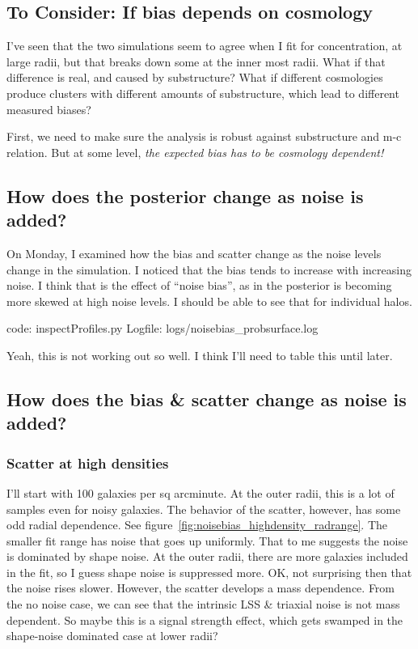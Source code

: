 \documentclass[11pt]{article}
\begin{document}

\subsection{To Consider: If bias depends on cosmology}

I've seen that the two simulations seem to agree when I fit for concentration, at large radii, but that breaks down some at the inner most radii. What if that difference is real, and caused by substructure? What if different cosmologies produce clusters with different amounts of substructure, which lead to different measured biases? 

First, we need to make sure the analysis is robust against substructure and m-c relation. But at some level, \emph{the expected bias has to be cosmology dependent!}


\subsection{How does the posterior change as noise is added?}
\label{sec:noisebias_posteriors}

On Monday, I examined how the bias and scatter change as the noise levels change in the simulation. I noticed that the bias tends to increase with increasing noise. I think that is the effect of ``noise bias'', as in the posterior is becoming more skewed at high noise levels. I should be able to see that for individual halos. 

code: inspectProfiles.py
Logfile: logs/noisebias\_probsurface.log

Yeah, this is not working out so well. I think I'll need to table this until later.


\subsection{How does the bias \& scatter change as noise is added?}
\label{sec:noisebias_bias}


\subsubsection{Scatter at high densities}

I'll start with 100 galaxies per sq arcminute. At the outer radii, this is a lot of samples even for noisy galaxies. The behavior of the scatter, however, has some odd radial dependence. See figure~\ref{fig:noisebias_highdensity_radrange}. The smaller fit range has noise that goes up uniformly. That to me suggests the noise is dominated by shape noise. At the outer radii, there are more galaxies included in the fit, so I guess shape noise is suppressed more. OK, not surprising then that the noise rises slower. However, the scatter develops a mass dependence. From the no noise case, we can see that the intrinsic LSS \& triaxial noise is not mass dependent. So maybe this is a signal strength effect, which gets swamped in the shape-noise dominated case at lower radii?
\end{document}
